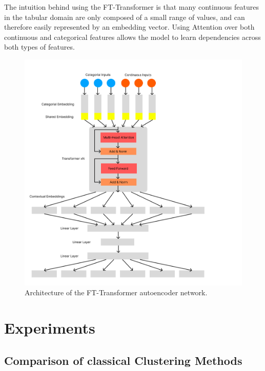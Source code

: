 The intuition behind using the FT-Transformer is that many continuous features in the tabular domain are only composed of a small range of values, and can therefore easily represented by an embedding vector. Using Attention over both continuous and categorical features allows the model to learn dependencies across both types of features.

\begin{figure}
\centering
	\includegraphics[width=1.2\linewidth]{ft_transformer_autoencoder.png}
	\caption{Architecture of the FT-Transformer autoencoder network.}
	\label{ft_transformer_autoencoder}
\end{figure}

\chapter{Experiments} \label{Experiments}

\section{Comparison of classical Clustering Methods}

